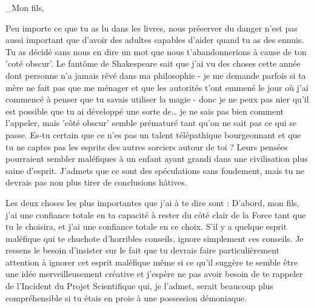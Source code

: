 \_Mon fils,

Peu importe ce que tu as lu dans les livres, nous préserver du danger n'est pas aussi important que d'avoir des adultes capables d'aider quand tu as des ennuis. Tu as décidé sans nous en dire un mot que nous t'abandonnerions à cause de ton 'coté obscur'. Le fantôme de Shakespeare sait que j'ai vu des choses cette année dont personne n'a jamais rêvé dans ma philosophie - je me demande parfois si ta mère ne fait pas que me ménager et que les autorités t'ont emmené le jour où j'ai commencé à penser que tu savais utiliser la magie - donc je ne peux pas nier qu'il est possible que tu ai développé une sorte de… je ne sais pas bien comment l'appeler, mais 'côté obscur' semble prématuré tant qu'on ne sait pas ce qui se passe. Es-tu certain que ce n'es pas un talent télépathique bourgeonnant et que tu ne captes pas les esprits des autres sorciers autour de toi ? Leurs pensées pourraient sembler maléfiques à un enfant ayant grandi dans une civilisation plus saine d'esprit. J'admets que ce sont des spéculations sans fondement, mais tu ne devrais pas non plus tirer de conclusions hâtives.

Les deux choses les plus importantes que j'ai à te dire sont : D'abord, mon fils, j'ai une confiance totale en ta capacité à rester du côté clair de la Force tant que tu le choisira, et j'ai une confiance totale en ce choix. S'il y a quelque esprit maléfique qui te chuchote d'horribles conseils, ignore simplement ces conseils. Je ressens le besoin d'insister sur le fait que tu devrais faire particulièrement attention à ignorer cet esprit maléfique même si ce qu'il suggère te semble être une idée merveilleusement créative et j'espère ne pas avoir besoin de te rappeler de l'Incident du Projet Scientifique qui, je l'admet, serait beaucoup plus compréhensible si tu étais en proie à une possession démoniaque.

